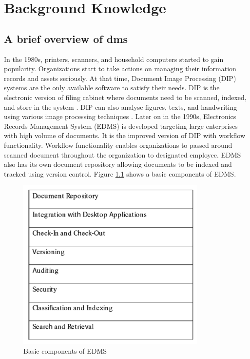 \chapter{Background Knowledge}

\section{A brief overview of \gls{dms}}
In the 1980s, printers, scanners, and household computers started to gain popularity.
Organizations start to take actions on managing their information records and assets seriously.
At that time, Document Image Processing (DIP) systems are the only available software to satisfy their needs.
DIP is the electronic version of filing cabinet where documents need to be scanned, indexed, and store in the system \cite{1_adam_2008}.
DIP can also analyse figures, texts, and handwriting using various image processing techniques \cite{akram2010document}.
Later on in the 1990s, Electronics Records Management System (EDMS) is developed targeting large enterprises with high volume of documents.
It is the improved version of DIP with workflow functionality.
Workflow functionality enables organizations to passed around scanned document throughout the organization to designated employee.
EDMS also has its own document repository allowing documents to be indexed and tracked using version control.
Figure \ref{fig:edms-components} shows a basic components of EDMS.
\begin{figure}[h]
	\centering
	\includegraphics[scale=0.7]{res/bg-knowledge/edms-components.png}
	\caption{Basic components of EDMS \cite{1_adam_2008}}
	\label{fig:edms-components}
\end{figure}